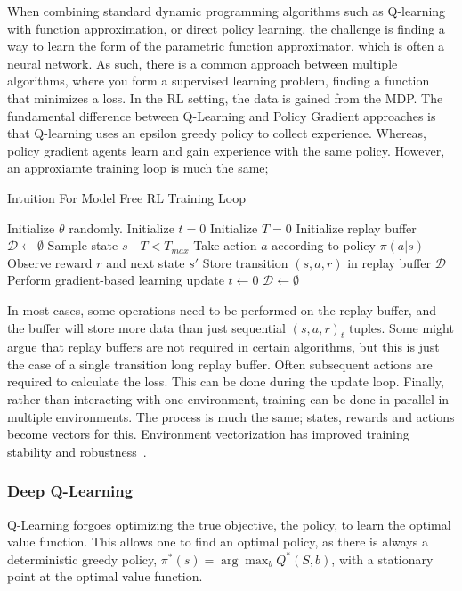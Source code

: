 When combining standard dynamic programming algorithms such as Q-learning with function approximation, or direct policy learning, the challenge is finding a way to learn the form of the parametric function approximator, which is often a neural network. As such, there is a common approach between multiple algorithms, where you form a supervised learning problem, finding a function that minimizes a loss. In the RL setting, the data is gained from the MDP. The fundamental difference between Q-Learning and Policy Gradient approaches is that Q-learning uses an epsilon greedy policy to collect experience. Whereas, policy gradient agents learn and gain experience with the same policy. However, an approxiamte training loop is much the same;

\begin{algorithm}
	\caption{Intuition For Model Free RL Training Loop}
	\begin{algorithmic}
		\State Initialize $\theta$ randomly.
		\State Initialize $t=0$
		\State Initialize $T=0$
		\State Initialize replay buffer $\mathcal{D} \leftarrow \emptyset$
		\State Sample state $s$
		\While $\text{ }T < T_{max}$
		\State Take action $a$ according to policy $\pi(a|s)$
		\State Observe reward $r$ and next state $s'$
		\State Store transition $(s, a, r)$ in replay buffer $\mathcal{D}$
		\State Perform gradient-based learning update
		\State $t \leftarrow 0$
		\State $\mathcal{D} \leftarrow \emptyset$
		\EndIf

		\EndWhile

	\end{algorithmic}
\end{algorithm}
In most cases, some operations need to be performed on the replay buffer, and the buffer will store more data than just sequential $(s, a,r)_t$ tuples. Some might argue that replay buffers are not required in certain algorithms, but this is just the case of a single transition long replay buffer. Often subsequent actions are required to calculate the loss. This can be done during the update loop. Finally, rather than interacting with one environment, training can be done in parallel in multiple environments. The process is much the same; states, rewards and actions become vectors for this. Environment vectorization has improved training stability and robustness~\cite{minh2016asynchronous}.

\subsubsection{Deep Q-Learning}\label{sec:Q-learning}
Q-Learning forgoes optimizing the true objective, the policy, to learn the optimal value function. This allows one to find an optimal policy, as there is always a deterministic greedy policy, $\pi^*(s) = \arg \max_{b} Q^*(S, b)$, with a stationary point at the optimal value function.

